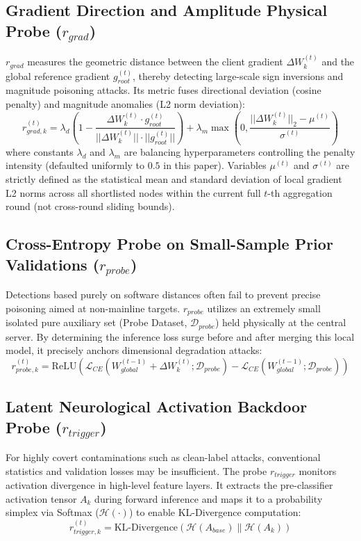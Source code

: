 \documentclass[runningheads]{llncs}
\begin{document}
\subsection{Gradient Direction and Amplitude Physical Probe ($r_{grad}$)}
$r_{grad}$ measures the geometric distance between the client gradient $\Delta W_k^{(t)}$ and the global reference gradient $g_{root}^{(t)}$, thereby detecting large-scale sign inversions and magnitude poisoning attacks. Its metric fuses directional deviation (cosine penalty) and magnitude anomalies (L2 norm deviation):
\begin{equation}
    r_{grad, k}^{(t)} = \lambda_{d} \left(1 - \frac{\Delta W_k^{(t)} \cdot g_{root}^{(t)}}{||\Delta W_k^{(t)}|| \cdot ||g_{root}^{(t)}||}\right) + \lambda_{m} \max\left(0, \frac{||\Delta W_k^{(t)}||_2 - \mu^{(t)}}{\sigma^{(t)}}\right)
\end{equation}
where constants $\lambda_d$ and $\lambda_m$ are balancing hyperparameters controlling the penalty intensity (defaulted uniformly to $0.5$ in this paper). Variables $\mu^{(t)}$ and $\sigma^{(t)}$ are strictly defined as the statistical mean and standard deviation of local gradient L2 norms across all shortlisted nodes within the current full $t$-th aggregation round (not cross-round sliding bounds).

\subsection{Cross-Entropy Probe on Small-Sample Prior Validations ($r_{probe}$)}
Detections based purely on software distances often fail to prevent precise poisoning aimed at non-mainline targets. $r_{probe}$ utilizes an extremely small isolated pure auxiliary set (Probe Dataset, $\mathcal{D}_{probe}$) held physically at the central server. By determining the inference loss surge before and after merging this local model, it precisely anchors dimensional degradation attacks:
\begin{equation}
    r_{probe, k}^{(t)} = \text{ReLU}\left( \mathcal{L}_{CE}(W_{global}^{(t-1)} + \Delta W_k^{(t)}; \mathcal{D}_{probe}) - \mathcal{L}_{CE}(W_{global}^{(t-1)}; \mathcal{D}_{probe}) \right)
\end{equation}

\subsection{Latent Neurological Activation Backdoor Probe ($r_{trigger}$)}
For highly covert contaminations such as clean-label attacks, conventional statistics and validation losses may be insufficient. The probe $r_{trigger}$ monitors activation divergence in high-level feature layers. It extracts the pre-classifier activation tensor $A_k$ during forward inference and maps it to a probability simplex via Softmax ($\mathcal{H}(\cdot)$) to enable KL-Divergence computation:
\begin{equation}
    r_{trigger, k}^{(t)} = \text{KL-Divergence}\left( \mathcal{H}(A_{base}) \| \mathcal{H}(A_k) \right)
\end{equation}
\end{document}
